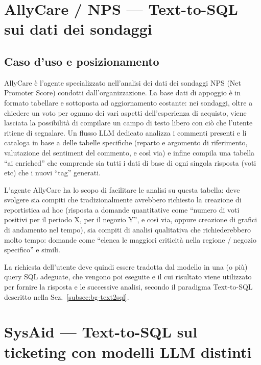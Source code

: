 \section{AllyCare / NPS --- Text-to-SQL sui dati dei sondaggi}
\label{sec:agenti-allycare-arch}

\subsection{Caso d'uso e posizionamento}
\label{subsec:allycare-caso-uso}

AllyCare è l'agente specializzato nell'analisi dei dati dei sondaggi NPS (Net Promoter Score) condotti dall'organizzazione.
La base dati di appoggio è in formato tabellare e sottoposta ad aggiornamento costante:
nei sondaggi, oltre a chiedere un voto per ognuno dei vari aspetti dell'esperienza di acquisto, viene lasciata la possibilità di compilare
un campo di testo libero con ciò che l'utente ritiene di segnalare.
Un flusso LLM dedicato analizza i commenti presenti e li cataloga in base a delle tabelle specifiche (reparto e argomento di riferimento, valutazione del sentiment del commento, e così via)
e infine compila una tabella ``ai enriched'' che comprende sia tutti i dati di base di ogni singola risposta (voti etc) che i nuovi ``tag'' generati.

L'agente AllyCare ha lo scopo di facilitare le analisi su questa tabella: 
deve svolgere sia compiti che tradizionalmente avrebbero richiesto la creazione di reportistica ad hoc
(risposta a domande quantitative come ``numero di voti positivi per il periodo X, per il negozio Y'', e così via,
oppure creazione di grafici di andamento nel tempo), sia compiti di analisi qualitativa
che richiederebbero molto tempo: domande come ``elenca le maggiori criticità nella regione / negozio specifico'' e simili.

La richiesta dell'utente deve quindi essere tradotta dal modello in una (o più) query SQL adeguate, 
che vengono poi eseguite e il cui risultato viene utilizzato
per fornire la risposta e le successive analisi, secondo il paradigma Text-to-SQL descritto nella Sez.~\ref{subsec:bg-text2sql}.

\section{SysAid --- Text-to-SQL sul ticketing con modelli LLM distinti}
\label{sec:agenti-sysaid-arch}

